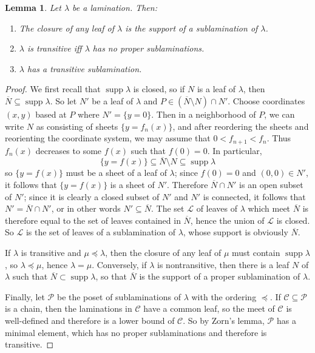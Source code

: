 \documentclass[reqno,11pt]{amsart}
\DeclareMathOperator{\supp}{supp}
\newtheorem{lemma}[theorem]{Lemma}
\theoremstyle{definition}
\numberwithin{equation}{section}
\begin{document}
\begin{lemma}
Let $\lambda$ be a lamination. Then:
\begin{enumerate}
\item The closure of any leaf of $\lambda$ is the support of a sublamination of $\lambda$.
\item $\lambda$ is transitive iff $\lambda$ has no proper sublaminations.
\item $\lambda$ has a transitive sublamination.
\end{enumerate}
\end{lemma}
\begin{proof}
We first recall that $\supp \lambda$ is closed, so if $N$ is a leaf of $\lambda$, then $\overline N \subseteq \supp \lambda$.
So let $N'$ be a leaf of $\lambda$ and $P \in (\overline N \setminus N) \cap N'$.
Choose coordinates $(x, y)$ based at $P$ where $N' = \{y = 0\}$.
Then in a neighborhood of $P$, we can write $N$ as consisting of sheets $\{y = f_n(x)\}$, and after reordering the sheets and reorienting the coordinate system, we may assume that $0 < f_{n + 1} < f_n$.
Thus $f_n(x)$ decreases to some $f(x)$ such that $f(0) = 0$.
In particular,
$$\{y = f(x)\} \subseteq \overline N \setminus N \subseteq \supp \lambda$$
so $\{y = f(x)\}$ must be a sheet of a leaf of $\lambda$; since $f(0) = 0$ and $(0, 0) \in N'$, it follows that $\{y = f(x)\}$ is a sheet of $N'$.
Therefore $\overline N \cap N'$ is an open subset of $N'$; since it is clearly a closed subset of $N'$ and $N'$ is connected, it follows that $N' = \overline N \cap N'$, or in other words $N' \subseteq \overline N$.
The set $\mathscr L$ of leaves of $\lambda$ which meet $\overline N$ is therefore equal to the set of leaves contained in $\overline N$, hence the union of $\mathscr L$ is closed.
So $\mathscr L$ is the set of leaves of a sublamination of $\lambda$, whose support is obviously $\overline N$.

If $\lambda$ is transitive and $\mu \preceq \lambda$, then the closure of any leaf of $\mu$ must contain $\supp \lambda$, so $\lambda \preceq \mu$, hence $\lambda = \mu$.
Conversely, if $\lambda$ is nontransitive, then there is a leaf $N$ of $\lambda$ such that $\overline N \subset \supp \lambda$, so that $\overline N$ is the support of a proper sublamination of $\lambda$.

Finally, let $\mathscr P$ be the poset of sublaminations of $\lambda$ with the ordering $\preceq$.
If $\mathscr C \subseteq \mathscr P$ is a chain, then the laminations in $\mathscr C$ have a common leaf, so the meet of $\mathscr C$ is well-defined and therefore is a lower bound of $\mathscr C$.
So by Zorn's lemma, $\mathscr P$ has a minimal element, which has no proper sublaminations and therefore is transitive.
\end{proof}
\end{document}
